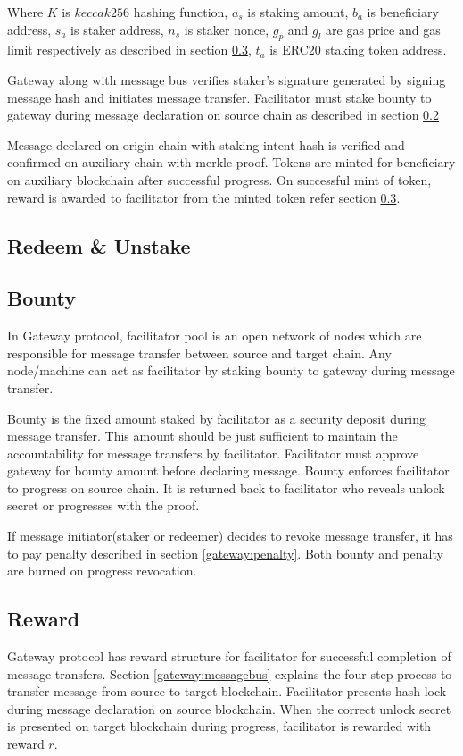 \documentclass[12pt,a4paper]{article}
\begin{document}
Where $K$ is $keccak256$ hashing function, $a_s$ is staking amount, $b_a$ is beneficiary address, $s_a$ is staker address, $n_s$ is staker nonce, $g_p$ and $g_l$ are gas price and gas limit respectively as described in section \ref{gateway:reward}, $t_a$ is ERC20 staking token address. 

Gateway along with message bus verifies staker’s signature generated by signing message hash and initiates message transfer.
Facilitator must stake bounty to gateway during message declaration on source chain as described in section \ref{gateway:bounty} 

Message declared on origin chain with staking intent hash is verified and confirmed on auxiliary chain with merkle proof. 
Tokens are minted for beneficiary on auxiliary blockchain after successful progress. 
On successful mint of token, reward is awarded to facilitator from the minted token refer section \ref{gateway:reward}.

\subsection{Redeem \& Unstake}\label{gateway:redeemunstake}
\subsection{Bounty}\label{gateway:bounty}
 In Gateway protocol, facilitator pool is an open network of nodes which are responsible for message transfer between source and target chain. 
 Any node/machine can act as facilitator by staking bounty to gateway during message transfer. 

Bounty is the fixed amount staked by facilitator as a security deposit during message transfer.
This amount should be just sufficient to maintain the accountability for message transfers by facilitator. 
Facilitator must approve gateway for bounty amount before declaring message. 
Bounty enforces facilitator to progress on source chain. 
It is returned back to facilitator who reveals unlock secret or progresses with the proof.

If message initiator(staker or redeemer) decides to revoke message transfer, it has to pay penalty described in section \ref{gateway:penalty}. 
Both bounty and penalty are burned on progress revocation. 

\subsection{Reward}\label{gateway:reward}
Gateway protocol has reward structure for facilitator for successful completion of message transfers. 
Section \ref{gateway:messagebus} explains the four step process to transfer message from source to target blockchain. 
Facilitator presents hash lock during message declaration on source blockchain. 
When the correct unlock secret is presented on target blockchain during progress, facilitator is rewarded with reward $r$. 
\end{document}

